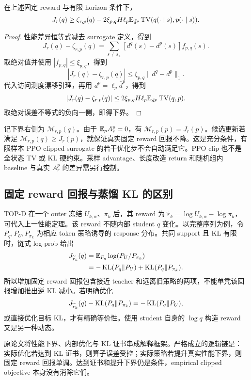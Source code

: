 \begin{theorem}
\label{thm:topd-performance-bound}
在上述固定 reward 与有限 horizon 条件下，
\begin{equation}
 J_r(q)\geq\zeta_{r,p}(q)
 -2\xi_{p,q}H\ell_p\mathbb{E}_{\bar d^p}\operatorname{TV}(q(\cdot\mid s),p(\cdot\mid s)).
 \label{eq:topd-performance-bound}
\end{equation}
\end{theorem}
\begin{proof}
性能差异恒等式减去 surrogate 定义，得到
\[
 J_r(q)-\zeta_{r,p}(q)=\sum_{s\ne s_\bot}[d^q(s)-d^p(s)]f_{p,q}(s).
\]
取绝对值并使用 $|f_{p,q}|\leq\xi_{p,q}$，得到
\[
 |J_r(q)-\zeta_{r,p}(q)|\leq\xi_{p,q}\|d^q-d^p\|_1.
\]
代入访问测度漂移引理，再用 $d^p=\ell_p\bar d^p$，得到
\[
 |J_r(q)-\zeta_{r,p}(q)|\leq2\xi_{p,q}H\ell_p\mathbb{E}_{\bar d^p}\operatorname{TV}(q,p).
\]
取绝对误差不等式的负向一侧，即得下界。
\end{proof}

记下界右侧为 $\mathcal M_{r,p}(q)$。由于 $\mathbb{E}_pA_r^p=0$，有 $\mathcal M_{r,p}(p)=J_r(p)$。候选更新若满足 $\mathcal M_{r,p}(q)\geq J_r(p)$，就保证真实固定 reward 回报不降。这是充分条件，有限样本 PPO clipped surrogate 的若干优化步不会自动满足它。PPO clip 也不是全状态 TV 或 KL 硬约束。采样 advantage、长度改造 return 和随机组内 baseline 与真实 $A_r^p$ 的差异需另行控制。

\subsection{固定 reward 回报与蒸馏 KL 的区别}

TOP-D 在一个 outer 冻结 $U_{k,\alpha}$、$\pi_k$ 后，其 reward 为 $\widetilde r_k=\log U_{k,\alpha}-\log\pi_k$，可代入上一性能定理。该 reward 不随内部 student $q$ 变化。以完整序列为例，令 $P_q,P_U,P_{\pi_k}$ 为相应 token 策略诱导的 response 分布。共同 support 且 KL 有限时，链式 log-prob 给出
\begin{align}
 J_{\widetilde r_k}(q)&=\mathbb{E}_{P_q}\log(P_U/P_{\pi_k})\\
 &=-\operatorname{KL}(P_q\Vert P_U)+\operatorname{KL}(P_q\Vert P_{\pi_k}).
 \label{eq:topd-return-kl-identity}
\end{align}
所以增加固定 reward 回报包含接近 teacher 和远离旧策略的两项，不能单凭该回报增加推出逆 KL 减小。若明确优化
\[
 J_{\widetilde r_k}(q)-\operatorname{KL}(P_q\Vert P_{\pi_k})=-\operatorname{KL}(P_q\Vert P_U),
\]
或直接优化目标 KL，才有精确等价性。使用 student 自身的 $\log q$ 构造 reward 又是另一种动态。

原论文将性能下界、内部优化与 KL 证书串成解释框架。严格成立的逻辑链是：实际优化若达到 KL 证书，则算子误差受控；实际策略若提升真实性能下界，则固定 reward 回报单调。达到证书和提升下界仍是条件，empirical clipped objective 本身没有消除它们。

